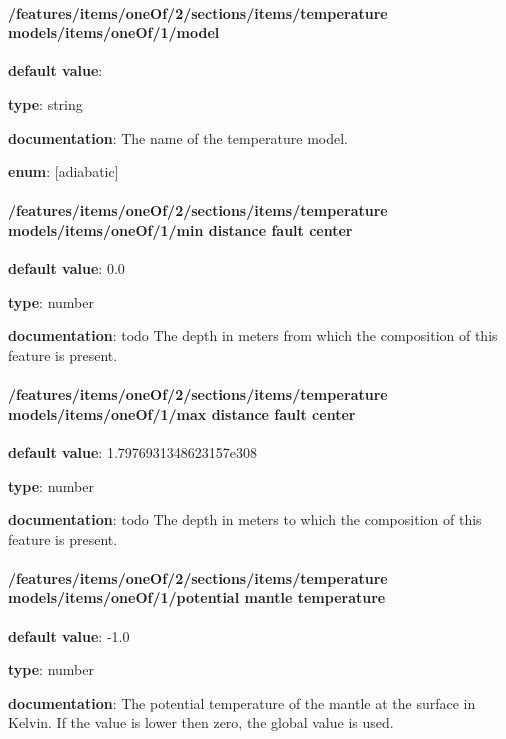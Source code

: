 \paragraph{/features/items/oneOf/2/sections/items/temperature models/items/oneOf/1/model} \begin{itemized}
\item {\bf default value}: 
\item {\bf type}: string
\item {\bf documentation}: The name of the temperature model.
\item {\bf enum}: [adiabatic]\end{itemized}\paragraph{/features/items/oneOf/2/sections/items/temperature models/items/oneOf/1/min distance fault center} \begin{itemized}
\item {\bf default value}: 0.0
\item {\bf type}: number
\item {\bf documentation}: todo The depth in meters from which the composition of this feature is present.
\end{itemized}\paragraph{/features/items/oneOf/2/sections/items/temperature models/items/oneOf/1/max distance fault center} \begin{itemized}
\item {\bf default value}: 1.7976931348623157e308
\item {\bf type}: number
\item {\bf documentation}: todo The depth in meters to which the composition of this feature is present.
\end{itemized}\paragraph{/features/items/oneOf/2/sections/items/temperature models/items/oneOf/1/potential mantle temperature} \begin{itemized}
\item {\bf default value}: -1.0
\item {\bf type}: number
\item {\bf documentation}: The potential temperature of the mantle at the surface in Kelvin. If the value is lower then zero, the global value is used.

\end{itemized}
